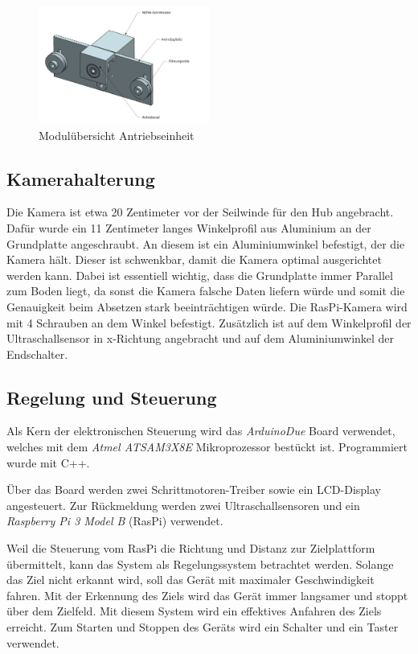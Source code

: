 \documentclass[a4paper]{report}
\begin{document}
\begin{figure}[h!]
	\centering
	\includegraphics[keepaspectratio,width=0.5\textwidth]{Antriebseinheit}
	\caption{Modulübersicht Antriebseinheit	}
	\label{fig:SystemArchitektur}
\end{figure}

\subsection{Kamerahalterung} %
Die Kamera ist etwa 20 Zentimeter vor der Seilwinde für den Hub angebracht. Dafür wurde ein 11 Zentimeter langes Winkelprofil aus Aluminium an der Grundplatte angeschraubt. An diesem ist ein Aluminiumwinkel befestigt, der die Kamera hält. Dieser ist schwenkbar, damit die Kamera optimal ausgerichtet werden kann. Dabei ist essentiell wichtig, dass die Grundplatte immer Parallel zum Boden liegt, da sonst die Kamera falsche Daten liefern würde und somit die Genauigkeit beim Absetzen stark beeinträchtigen würde. Die RasPi-Kamera wird mit 4 Schrauben an dem Winkel befestigt. Zusätzlich ist auf dem Winkelprofil der Ultraschallsensor in x-Richtung angebracht und auf dem Aluminiumwinkel der Endschalter.

\subsection{Regelung und Steuerung}
Als Kern der elektronischen Steuerung wird das \textit{ArduinoDue} Board verwendet, welches mit dem \textit{Atmel ATSAM3X8E} Mikroprozessor bestückt ist. Programmiert wurde mit C++.

Über das Board werden zwei Schrittmotoren-Treiber sowie ein LCD-Display angesteuert. Zur Rückmeldung werden zwei Ultraschallsensoren und ein \textit{Raspberry Pi 3 Model B} (RasPi) verwendet.

Weil die Steuerung vom RasPi die Richtung und Distanz zur Zielplattform übermittelt, kann das System als Regelungssystem betrachtet werden. Solange das Ziel nicht erkannt wird, soll das Gerät mit maximaler Geschwindigkeit fahren. Mit der Erkennung des Ziels wird das Gerät immer langsamer und stoppt über dem Zielfeld. Mit diesem System wird ein effektives Anfahren des Ziels erreicht. Zum Starten und Stoppen des Geräts wird ein Schalter und ein Taster verwendet.
\end{document}
